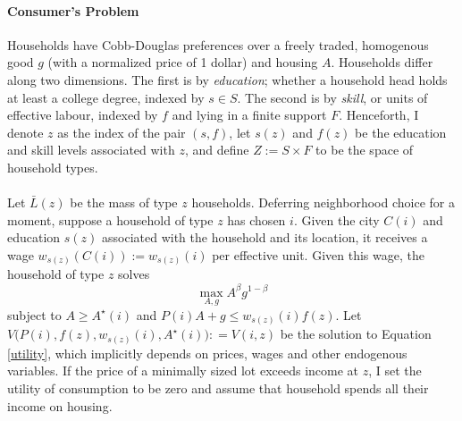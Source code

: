 \documentclass[]{article}
\begin{document}
\paragraph*{Consumer's Problem}
Households have Cobb-Douglas preferences over a freely traded, homogenous good $g$ (with a normalized price of 1 dollar) and housing $A$. Households differ along two dimensions. The first is by \textit{education}; whether a household head holds at least a college degree, indexed by $s \in S$. The second is by \textit{skill}, or units of effective labour, indexed by $f$ and lying in a finite support $F$. Henceforth, I denote $z$ as the index of the pair $(s, f)$, let $s(z)$ and $f(z)$ be the education and skill levels associated with $z$, and define $Z := S \times F$ to be the space of household types. 
\paragraph*{}
Let $\bar{L}(z)$ be the mass of type $z$ households. Deferring neighborhood choice for a moment, suppose a household of type $z$ has chosen $i$.  Given the city $C(i)$ and education $s(z)$ associated with the household and its location, it receives a wage $w_{s(z)}(C(i)) := w_{s(z)}(i)$ per effective unit. Given this wage, the household of type $z$ solves
\begin{equation}\label{utility}
	\max_{A, g} A^{\beta}g^{1-\beta}
\end{equation} 
subject to $A \geq A^{\star}(i)$ and $P(i)A + g \leq w_{s(z)}(i)f(z)$. Let  $V\big(P(i), f(z), w_{s(z)}(i), A^{\star}(i)\big) : = V(i, z)$ be the solution to Equation \eqref{utility}, which implicitly depends on prices, wages and other endogenous variables. If the price of a minimally sized lot exceeds income at $z$, I set the utility of consumption to be zero and assume that household spends all their income on housing.
\end{document}
